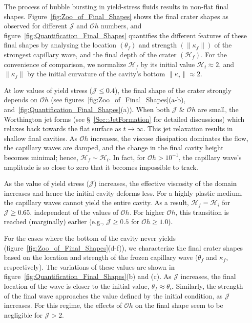 \documentclass[final]{jfm}
\begin{document}
The process of bubble bursting in yield-stress fluids results in non-flat final shapes.
Figure~\ref{fig:Zoo_of_Final_Shapes} shows the final crater shapes as observed for different $\mathcal{J}$ and $\mathcal{O}h$ numbers, and figure~\ref{fig:Quantification_Final_Shapes} quantifies the different features of these final shapes by analysing the location $\left(\theta_f\right)$ and strength $\left(\|\kappa_f\|\right)$ of the strongest capillary wave, and the final depth of the crater $\left(\mathcal{H}_f\right)$. For the convenience of comparison, we normalize $\mathcal{H}_f$ by its initial value $\mathcal{H}_i \approx 2$, and $\|\kappa_f\|$ by the initial curvature of the cavity's bottom $\|\kappa_i\| \approx 2$. 

At low values of yield stress ($\mathcal{J} \le 0.4$), the final shape of the crater strongly depends on $\mathcal{O}h$ (see figures~\ref{fig:Zoo_of_Final_Shapes}(a-b), and~\ref{fig:Quantification_Final_Shapes}(a)).
When both $\mathcal{J}$ \& $\mathcal{O}h$ are small, the Worthington jet forms (see \S~\ref{Sec::JetFormation} for detailed discussions) which relaxes back towards the flat surface as $t \to \infty$. This jet relaxation results in shallow final cavities.
As $\mathcal{O}h$ increases, the viscose dissipation dominates the flow, the capillary waves are damped, and the change in the final cavity height becomes minimal; hence, $\mathcal{H}_f \sim \mathcal{H}_i$. In fact, for $\mathcal{O}h > 10^{-1}$, the capillary wave's amplitude is so close to zero that it becomes impossible to track.

As the value of yield stress ($\mathcal{J}$) increases, the effective viscosity of the domain increases and hence the initial cavity deforms less. For a highly plastic medium, the capillary waves cannot yield the entire cavity. As a result, $\mathcal{H}_f = \mathcal{H}_i$ for $\mathcal{J} \ge 0.65$, independent of the values of $\mathcal{O}h$. For higher $\mathcal{O}h$, this transition is reached (marginally) earlier (e.g., $\mathcal{J} \ge 0.5$ for $\mathcal{O}h \ge 1.0$).

For the cases where the bottom of the cavity never yields (figure~\ref{fig:Zoo_of_Final_Shapes}(d-f)), we characterize the final crater shapes based on the location and strength of the frozen capillary wave ($\theta_f$ and $\kappa_f$, respectively). The variations of these values are shown in figure~\ref{fig:Quantification_Final_Shapes}(b) and (c). As $\mathcal{J}$ increases, the final location of the wave is closer to the initial value, $\theta_f \approx \theta_i$. Similarly, the strength of the final wave approaches the value defined by the initial condition, as $\mathcal{J}$ increases. For this regime, the effects of $\mathcal{O}h$ on the final shape seem to be negligible for $\mathcal{J} > 2$. 
\end{document}

